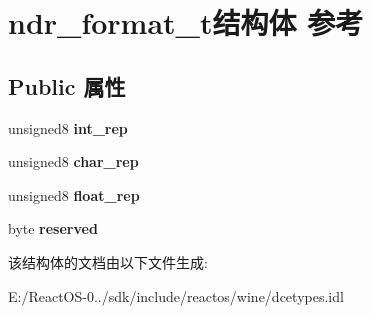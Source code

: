 \hypertarget{structndr__format__t}{}\section{ndr\+\_\+format\+\_\+t结构体 参考}
\label{structndr__format__t}
\subsection*{Public 属性}
\begin{DoxyCompactItemize}
\item 
\mbox{\label{structndr__format__t_a2608637df392a30ab83a0960eee7f391}} 
unsigned8 {\bfseries int\+\_\+rep}
\item 
\mbox{\label{structndr__format__t_a64550a32a55e21b15f7e48f738a67d9a}} 
unsigned8 {\bfseries char\+\_\+rep}
\item 
\mbox{\label{structndr__format__t_ae1f53b1142e3f58dcecf9412cc597e4a}} 
unsigned8 {\bfseries float\+\_\+rep}
\item 
\mbox{\label{structndr__format__t_a0aa0bc6e0587406258c5d632e6bbdc20}} 
byte {\bfseries reserved}
\end{DoxyCompactItemize}


该结构体的文档由以下文件生成\+:\begin{DoxyCompactItemize}
\item 
E\+:/\+React\+O\+S-\/0../sdk/include/reactos/wine/dcetypes.\+idl\end{DoxyCompactItemize}
